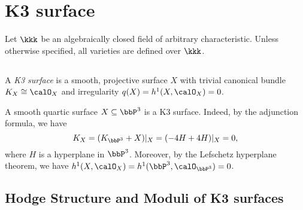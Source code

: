 \section{K3 surface}

Let \(\kkk\) be an algebraically closed field of arbitrary characteristic.
Unless otherwise specified, all varieties are defined over \(\kkk\).


\subsection{}

    \begin{definition}\label{def:K3_surface}
        A \emph{K3 surface} is a smooth, projective surface \(X\) with trivial canonical bundle \(K_X\cong \calO_X\) and irregularity \(q(X)=h^1(X,\calO_X)=0\).
    \end{definition}

    \begin{example}\label{ex:quartic_in_P3_is_K3}
        A smooth quartic surface \(X\subseteq \bbP^3\) is a K3 surface.
        Indeed, by the adjunction formula, we have
        \[
            K_X = (K_{\bbP^3} + X)|_X = (-4H + 4H)|_X = 0,
        \]
        where \(H\) is a hyperplane in \(\bbP^3\).
        Moreover, by the Lefschetz hyperplane theorem, we have \(h^1(X,\calO_X)=h^1(\bbP^3,\calO_{\bbP^3})=0\).
    \end{example}

\subsection{Hodge Structure and Moduli of K3 surfaces}

    